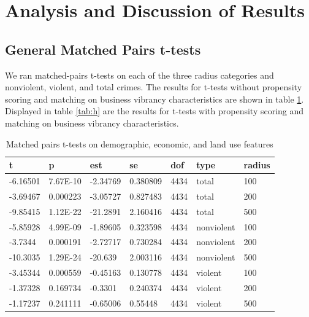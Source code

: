 \documentclass{article}
\begin{document}
\section{Analysis and Discussion of Results}
\subsection{General Matched Pairs t-tests}
We ran matched-pairs t-tests on each of the three radius categories and nonviolent, violent, and total crimes. The results for t-tests without propensity scoring and matching on business vibrancy characteristics are shown in table \ref{tab:g}. Displayed in table \ref{tab:h} are the results for t-tests with propensity scoring and matching on business vibrancy characteristics.
\begin{table}[h]
\begin{center}
\caption{\label{tab:g}Matched pairs t-tests on demographic, economic, and land use features}
\begin{tabular}{lllllll}
\hline
\textbf{t} & \textbf{p} & \textbf{est} & \textbf{se} & \textbf{dof} & \textbf{type}       & \textbf{radius} \\ \hline
-6.16501   & 7.67E-10   & -2.34769     & 0.380809    & 4434         & total      & 100    \\
-3.69467   & 0.000223   & -3.05727     & 0.827483    & 4434         & total      & 200    \\
-9.85415   & 1.12E-22   & -21.2891     & 2.160416    & 4434         & total      & 500    \\
-5.85928   & 4.99E-09   & -1.89605     & 0.323598    & 4434         & nonviolent & 100    \\
-3.7344    & 0.000191   & -2.72717     & 0.730284    & 4434         & nonviolent & 200    \\
-10.3035   & 1.29E-24   & -20.639      & 2.003116    & 4434         & nonviolent & 500    \\
-3.45344   & 0.000559   & -0.45163     & 0.130778    & 4434         & violent    & 100    \\
-1.37328   & 0.169734   & -0.3301      & 0.240374    & 4434         & violent    & 200    \\
-1.17237   & 0.241111   & -0.65006     & 0.55448     & 4434         & violent    & 500    \\ \hline
\end{tabular}
\end{center}
\end{table}
\end{document}
